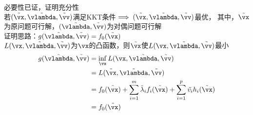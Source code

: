 \begin{analysis}
    必要性已证，证明充分性\\
    若$(\tilde{\vx},\tilde{\vlambda},\tilde{\vv})$满足KKT条件$\implies(\tilde{\vx},\tilde{\vlambda},\tilde{\vv})$最优，
    其中，$\tilde{\vx}$为原问题可行解，$(\tilde{\vlambda},\tilde{\vv})$为对偶问题可行解\\
    证明思路：$g(\tilde{\vlambda},\tilde{\vv})=f_0(\tilde{\vx})$\\
    $L(\vx,\tilde{\vlambda},\tilde{\vv})$为$\vx$的凸函数，则$\tilde{\vx}$使$L(\vx,\tilde{\vlambda},\tilde{\vv})$最小
    \[\begin{aligned}
        g(\tilde{\vlambda},\tilde{\vv})&=\inf_\vx L(\vx,\tilde{\vlambda},\tilde{\vv})\\
        &=L(\tilde{\vx},\tilde{\vlambda},\tilde{\vv})\\
        &=f_0(\tilde{\vx})+\sum_{i=1}^m\tilde{\lambda}_if_i(\tilde{\vx})+\sum_{i=1}^p\tilde{v_i}h_i(\tilde{\vx})\\
        &=f_0(\tilde{\vx})
    \end{aligned}\]
\end{analysis}

